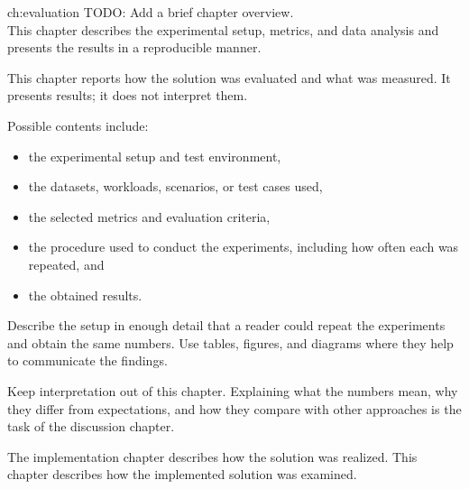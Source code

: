 \ThesisChapter
  {}
  {ch:evaluation}
  {TODO: Add a brief chapter overview. \\
  This chapter describes the experimental setup, metrics, and data analysis and presents the results in a reproducible manner.}


This chapter reports how the solution was evaluated and what was measured.
It presents results; it does not interpret them.

Possible contents include:
\begin{itemize}
  \item the experimental setup and test environment,
  \item the datasets, workloads, scenarios, or test cases used,
  \item the selected metrics and evaluation criteria,
  \item the procedure used to conduct the experiments, including how often each was repeated, and
  \item the obtained results.
\end{itemize}

Describe the setup in enough detail that a reader could repeat the experiments and obtain the same numbers.
Use tables, figures, and diagrams where they help to communicate the findings.

Keep interpretation out of this chapter.
Explaining what the numbers mean, why they differ from expectations, and how they compare with other approaches is the task of the discussion chapter.

The implementation chapter describes how the solution was realized.
This chapter describes how the implemented solution was examined.

\section{}
\label{sec:example-result-presentation}
\subsection{}
\label{sec:tabular-results}

